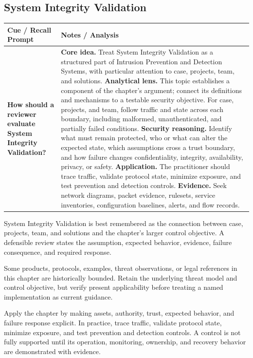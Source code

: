 \documentclass[11pt]{article}
\newcommand{\CornellHeader}{%
\rowcolor{Navy}\color{white}\bfseries Cue / Recall Prompt & \color{white}\bfseries Notes / Analysis\\\hline}
\newcommand{\CornellRow}[2]{%
\cellcolor{CueGray}\RaggedRight\textbf{#1} & \RaggedRight #2\\\hline}
\begin{document}
\subsection*{System Integrity Validation}
\begin{longtable}{>{\RaggedRight\arraybackslash}p{}|>{\RaggedRight\arraybackslash}p{}}
\CornellHeader
\CornellRow{How should a reviewer evaluate System Integrity Validation?}{\textbf{Core idea.} Treat System Integrity Validation as a structured part of Intrusion Prevention and Detection Systems, with particular attention to case, projects, team, and solutions. \textbf{Analytical lens.} This topic establishes a component of the chapter's argument; connect its definitions and mechanisms to a testable security objective. For case, projects, and team, follow traffic and state across each boundary, including malformed, unauthenticated, and partially failed conditions. \textbf{Security reasoning.} Identify what must remain protected, who or what can alter the expected state, which assumptions cross a trust boundary, and how failure changes confidentiality, integrity, availability, privacy, or safety. \textbf{Application.} The practitioner should trace traffic, validate protocol state, minimize exposure, and test prevention and detection controls. \textbf{Evidence.} Seek network diagrams, packet evidence, rulesets, service inventories, configuration baselines, alerts, and flow records.}
\end{longtable}
\begin{topicsummary}
System Integrity Validation is best remembered as the connection between case, projects, team, and solutions and the chapter's larger control objective. A defensible review states the assumption, expected behavior, evidence, failure consequence, and required response.
\end{topicsummary}
\begin{historybox}
Some products, protocols, examples, threat observations, or legal references in this chapter are historically bounded. Retain the underlying threat model and control objective, but verify present applicability before treating a named implementation as current guidance.
\end{historybox}
\begin{defensebox}
Apply the chapter by making assets, authority, trust, expected behavior, and failure response explicit. In practice, trace traffic, validate protocol state, minimize exposure, and test prevention and detection controls. A control is not fully supported until its operation, monitoring, ownership, and recovery behavior are demonstrated with evidence.
\end{defensebox}
\end{document}
